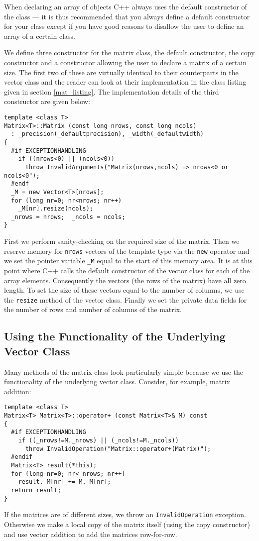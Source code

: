 When declaring an array of objects C++ always uses the default constructor
of the class --- it is thus recommended that you always define a default
constructor for your class except if you have good reasons to disallow
the user to define an array of a certain class.

We define three constructor for the matrix class, the default constructor,
the copy constructor and a constructor allowing the user to declare
a matrix of a certain size. The first two of these are virtually identical to 
their counterparts in the vector class and the reader can look at their
implementation in the class listing given in section \ref{mat_listing}.
The implementation details of the third constructor are given below:
{\footnotesize \begin{verbatim}
template <class T>
Matrix<T>::Matrix (const long nrows, const long ncols)
  : _precision(_defaultprecision), _width(_defaultwidth)
{
  #if EXCEPTIONHANDLING
    if ((nrows<0) || (ncols<0))
      throw InvalidArguments("Matrix(nrows,ncols) => nrows<0 or ncols<0");
  #endf
  _M = new Vector<T>[nrows];
  for (long nr=0; nr<nrows; nr++)
    _M[nr].resize(ncols);
  _nrows = nrows;  _ncols = ncols;
}
\end{verbatim}}

First we perform sanity-checking on the required size of the matrix.
Then we reserve memory for \verb+nrows+ vectors of the template 
type via the \verb+new+ operator and we set the pointer variable
\verb+_M+ equal to the start of this memory area. It is at this point
where C++ calls the default constructor of the vector class for
each of the array elements. Consequently the vectors (the rows
of the matrix) have all zero length. To set the size of these vectors
equal to the number of columns, we use the \verb+resize+ method
of the vector class. Finally we set the private data fields for the
number of rows and number of columns of the matrix.


\subsection{Using the Functionality of the Underlying Vector Class}

Many methods of the matrix class look particularly simple
because we use the functionality of the underlying vector
class. Consider, for example, matrix addition:
{\footnotesize \begin{verbatim}
template <class T>
Matrix<T> Matrix<T>::operator+ (const Matrix<T>& M) const
{
  #if EXCEPTIONHANDLING
    if ((_nrows!=M._nrows) || (_ncols!=M._ncols))
      throw InvalidOperation("Matrix::operator+(Matrix)");
  #endif
  Matrix<T> result(*this);
  for (long nr=0; nr<_nrows; nr++)
    result._M[nr] += M._M[nr];
  return result;
}
\end{verbatim}}
If the matrices are of different sizes, we throw an 
\verb+InvalidOperation+ exception. Otherwise we
make a local copy of the matrix itself (using the
copy constructor) and use vector addition to
add the matrices row-for-row.

